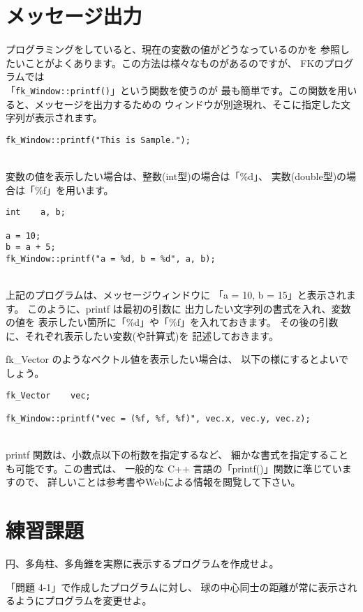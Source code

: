 \section{メッセージ出力}
プログラミングをしていると、現在の変数の値がどうなっているのかを
参照したいことがよくあります。この方法は様々なものがあるのですが、
FKのプログラムでは\\
「\verb+fk_Window::printf()+」という関数を使うのが
最も簡単です。この関数を用いると、メッセージを出力するための
ウィンドウが別途現れ、そこに指定した文字列が表示されます。\\
\begin{screen}
\begin{verbatim}
fk_Window::printf("This is Sample.");
\end{verbatim}
\end{screen}
~ \\
変数の値を表示したい場合は、整数(int型)の場合は「\%d」、
実数(double型)の場合は「\%f」を用います。\\
\begin{screen}
\begin{verbatim}
int    a, b;

a = 10;
b = a + 5;
fk_Window::printf("a = %d, b = %d", a, b);
\end{verbatim}
\end{screen}
~ \\
上記のプログラムは、メッセージウィンドウに
「a = 10, b = 15」と表示されます。
このように、printf は最初の引数に
出力したい文字列の書式を入れ、変数の値を
表示したい箇所に「\%d」や「\%f」を入れておきます。
その後の引数に、それぞれ表示したい変数(や計算式)を
記述しておきます。

fk\_Vector のようなベクトル値を表示したい場合は、
以下の様にするとよいでしょう。\\
\begin{screen}
\begin{verbatim}
fk_Vector    vec;

fk_Window::printf("vec = (%f, %f, %f)", vec.x, vec.y, vec.z);
\end{verbatim}
\end{screen}
~ \\
printf 関数は、小数点以下の桁数を指定するなど、
細かな書式を指定することも可能です。この書式は、
一般的な C++ 言語の「printf()」関数に準じていますので、
詳しいことは参考書やWebによる情報を閲覧して下さい。

\section{練習課題} \label{sec:05-q}
\begin{description}
 \myitem 円、多角柱、多角錐を実際に表示するプログラムを作成せよ。

 \myitem 「問題 4-1」で作成したプログラムに対し、
	球の中心同士の距離が常に表示されるようにプログラムを変更せよ。
\end{description}
